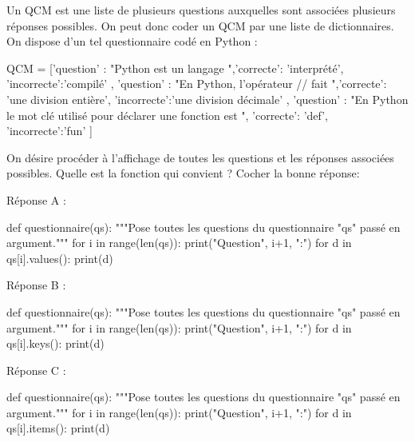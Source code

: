 \documentclass[a4paper,12,%
]{exam}
\begin{document}
\begin{questions}
\question Un QCM est une liste de plusieurs questions auxquelles sont associées plusieurs réponses possibles. On peut donc coder un QCM par une liste de dictionnaires.
On dispose d'un tel questionnaire codé en Python : \\
\begin{tcolorbox}[enhanced,colback=blue!5!white,colframe=blue!75!black]	
\begin{pyverbatim}
QCM = [{'question' : "Python est un langage  ",'correcte': 'interprété', 'incorrecte':'compilé' },
		{'question' : "En Python, l'opérateur // fait ",'correcte': 'une division entière',
		 'incorrecte':'une division décimale' },
		{'question' : "En Python le mot clé utilisé pour déclarer une fonction est  ",
		'correcte': 'def', 'incorrecte':'fun' }]
\end{pyverbatim} 
\end{tcolorbox}
On désire procéder à l'affichage de toutes les questions et les réponses associées possibles. Quelle est la fonction qui convient ?
Cocher la bonne réponse:
\begin{checkboxes}
\choice Réponse A : 
\begin{pyverbatim}
def questionnaire(qs):
	"""Pose toutes les questions du questionnaire "qs" passé en argument."""
	for i in range(len(qs)):
		print("Question", i+1, ":")
		for d in  qs[i].values():
			print(d)
\end{pyverbatim}
\choice Réponse B :
\begin{pyverbatim}
def questionnaire(qs):
	"""Pose toutes les questions du questionnaire "qs" passé en argument."""
	for i in range(len(qs)):
		print("Question", i+1, ":")
		for d in  qs[i].keys():
			print(d)
\end{pyverbatim}
\choice Réponse C :
\begin{pyverbatim}
def questionnaire(qs):
	"""Pose toutes les questions du questionnaire "qs" passé en argument."""
	for i in range(len(qs)):
		print("Question", i+1, ":")
		for d in  qs[i].items():
			print(d)
\end{pyverbatim}
\end{checkboxes}		


\end{questions}	
\end{document}
